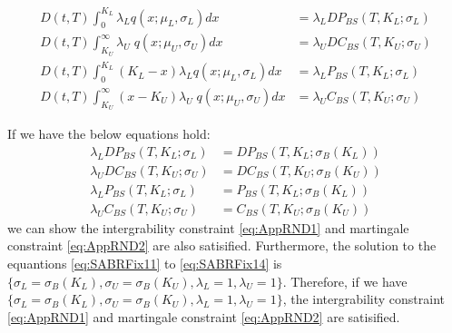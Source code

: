 \documentclass[letterpaper,12pt,titlepage,oneside,final]{book}
\numberwithin{equation}{section}
\theoremstyle{definition}
\begin{document}
 \begin{align}
 D(t,T)\int_{0}^{K_{L}}	\lambda_{L}   q(x;\mu_{L},\sigma_{L}) dx&=\lambda_{L} DP_{BS}(T,K_{L};\sigma_{L}) \label{eq:SABRFix01} \\
 D(t,T)\int_{K_{U}}^{\infty}	 \lambda_{U} \;  q(x;\mu_{U},\sigma_{U}) dx&=\lambda_{U} DC_{BS}(T,K_{U};\sigma_{U}) \label{eq:SABRFix02}\\
 D(t,T)\int_{0}^{K_{L}} (K_L-x)	\lambda_{L}   q(x;\mu_{L},\sigma_{L}) dx&=\lambda_{L} P_{BS}(T,K_{L};\sigma_{L})\label{eq:SABRFix03} \\
 D(t,T)\int_{K_{U}}^{\infty}	(x-K_U) \lambda_{U} \;  q(x;\mu_{U},\sigma_{U}) dx&=\lambda_{U} C_{BS}(T,K_{U};\sigma_{U})\label{eq:SABRFix04} 
 \end{align}


If we have the below equations hold: 
\begin{align}
		 \lambda_L DP_{BS}(T,K_{L};\sigma_L)&=DP_{BS}(T,K_{L};\sigma_{B}(K_{L})) \label{eq:SABRFix11} \\
		 \lambda_U DC_{BS}(T,K_{U};\sigma_U)&=DC_{BS}(T,K_{U};\sigma_{B}(K_{U}))  \label{eq:SABRFix12}\\
		 \lambda_L P_{BS}(T,K_{L};\sigma_L)&=P_{BS}(T,K_{L};\sigma_{B}(K_{L})) \label{eq:SABRFix13}\\
		 \lambda_U C_{BS}(T,K_{U};\sigma_U)&=C_{BS}(T,K_{U};\sigma_{B}(K_{U}))
	 \label{eq:SABRFix14}
	\end{align}
 we can  show the  intergrability constraint \eqref{eq:AppRND1} and martingale  constraint \eqref{eq:AppRND2} are also satisified.  Furthermore, the solution to the equantions \eqref{eq:SABRFix11} to \eqref{eq:SABRFix14} is $\{\sigma_{L}=\sigma_{B}(K_L),\sigma_{U}=\sigma_{B}(K_U), \lambda_{L}=1, \lambda_{U}=1\}$. Therefore, if we have $\{\sigma_{L}=\sigma_{B}(K_L),\sigma_{U}=\sigma_{B}(K_U), \lambda_{L}=1, \lambda_{U}=1\}$, the intergrability constraint \eqref{eq:AppRND1} and martingale  constraint \eqref{eq:AppRND2} are satisified. 
 
\end{document}
